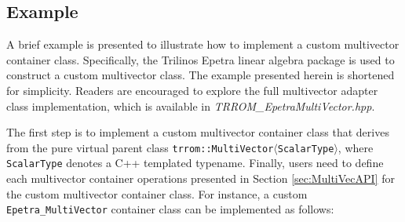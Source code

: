 \begin{enumerate}
    \end{enumerate}
    
    \subsection{Example}\label{subsec:MultiVecEx}
    
    A brief example is presented to illustrate how to implement a custom multivector container class. Specifically, the Trilinos Epetra linear algebra package is used to construct a custom multivector class. The example presented herein is shortened for simplicity. Readers are encouraged to explore the full multivector adapter class implementation, which is available in \emph{TRROM\_EpetraMultiVector.hpp}. 
    
    The first step is to implement a custom multivector container class that derives from the pure virtual parent class \texttt{trrom::MultiVector$\mathbf{\langle}$ScalarType$\mathbf{\rangle}$}, where \texttt{ScalarType} denotes a C++ templated typename. Finally, users need to define each multivector container operations presented in Section \ref{sec:MultiVecAPI} for the custom multivector container class. For instance, a custom \texttt{Epetra\_MultiVector} container class can be implemented as follows:
    
